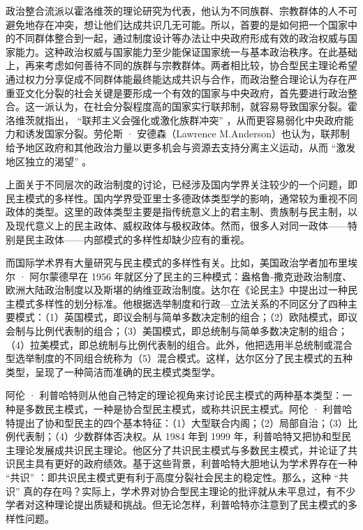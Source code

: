政治整合流派以霍洛维茨的理论研究为代表，他认为不同族群、宗教群体的人不可避免地存在冲突，想让他们达成共识几无可能。所以，首要的是如何把一个国家中的不同群体整合到一起，通过制度设计等办法让中央政府形成有效的政治权威与国家能力。这种政治权威与国家能力至少能保证国家统一与基本政治秩序。在此基础上，再来考虑如何善待不同的族群与宗教群体。两者相比较，协合型民主理论希望通过权力分享促成不同群体能最终能达成共识与合作，而政治整合理论认为存在严重亚文化分裂的社会关键是要形成一个有效的国家与中央政府，首先要进行政治整合。这一派认为，在社会分裂程度高的国家实行联邦制，就容易导致国家分裂。霍洛维茨就指出， “联邦主义会强化或激化族群冲突” ，从而更容易弱化中央政府能力和诱发国家分裂。劳伦斯 · 安德森（Lawrence M.Anderson）也认为，联邦制给予地区政府和其他政治力量以更多机会与资源去支持分离主义运动，从而 “激发地区独立的渴望” 。


上面关于不同层次的政治制度的讨论，已经涉及国内学界关注较少的一个问题，即民主模式的多样性。国内学界受亚里士多德政体类型学的影响，通常较为重视不同政体的类型。这里的政体类型主要是指传统意义上的君主制、贵族制与民主制，以及现代意义上的民主政体、威权政体与极权政体。然而，很多人对同一政体——特别是民主政体——内部模式的多样性却缺少应有的重视。

而国际学术界有大量研究与民主模式的多样性有关。比如，美国政治学者加布里埃尔 · 阿尔蒙德早在 1956 年就区分了民主的三种模式：盎格鲁-撒克逊政治制度、欧洲大陆政治制度以及斯堪的纳维亚政治制度。达尔在《论民主》中提出过一种民主模式多样性的划分标准。他根据选举制度和行政—立法关系的不同区分了四种主要模式：（1）英国模式，即议会制与简单多数决定制的组合；（2）欧陆模式，即议会制与比例代表制的组合；（3）美国模式，即总统制与简单多数决定制的组合；（4）拉美模式，即总统制与比例代表制的组合。此外，他把选用半总统制或混合型选举制度的不同组合统称为（5）混合模式。这样，达尔区分了民主模式的五种类型，呈现了一种简洁而准确的民主模式类型学。

阿伦 · 利普哈特则从他自己特定的理论视角来讨论民主模式的两种基本类型：一种是多数民主模式，一种是协合型民主模式，或称共识民主模式。阿伦 · 利普哈特提出了协和型民主的四个基本特征：（1）大型联合内阁；（2）局部自治；（3）比例代表制；（4）少数群体否决权。从 1984 年到 1999 年，利普哈特又把协和型民主理论发展成共识民主理论。他区分了共识民主模式与多数民主模式，并论证了共识民主具有更好的政府绩效。基于这些背景，利普哈特大胆地认为学术界存在一种 “共识” ：即共识民主模式更有利于高度分裂社会民主的稳定性。那么，这种 “共识” 真的存在吗？实际上，学术界对协合型民主理论的批评就从未平息过，有不少学者对这种理论提出质疑和挑战。但无论怎样，利普哈特亦注意到了民主模式的多样性问题。


